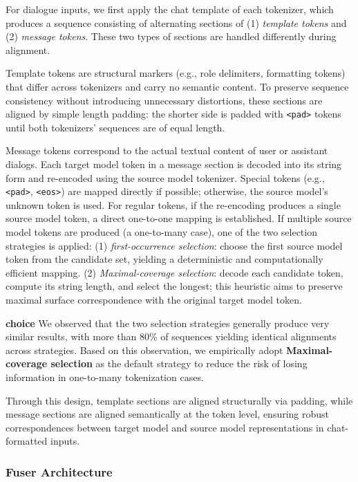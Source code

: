 For dialogue inputs, we first apply the chat template of each tokenizer, which produces a sequence consisting of alternating sections of (1) \emph{template tokens} and (2) \emph{message tokens}. These two types of sections are handled differently during alignment.

Template tokens are structural markers (e.g., role delimiters, formatting tokens) that differ across tokenizers and carry no semantic content. To preserve sequence consistency without introducing unnecessary distortions, these sections are aligned by simple length padding: the shorter side is padded with \texttt{<pad>} tokens until both tokenizers’ sequences are of equal length.

Message tokens correspond to the actual textual content of user or assistant dialogs. Each target model token in a message section is decoded into its string form and re-encoded using the source model tokenizer.
Special tokens (e.g., \texttt{<pad>}, \texttt{<eos>}) are mapped directly if possible; otherwise, the source model's unknown token is used.
For regular tokens, if the re-encoding produces a single source model token, a direct one-to-one mapping is established. If multiple source model tokens are produced (a one-to-many case), one of the two selection strategies is applied:
(1) \emph{first-occurrence selection}: choose the first source model token from the candidate set, yielding a deterministic and computationally efficient mapping.
(2) \emph{Maximal-coverage selection}: decode each candidate token, compute its string length, and select the longest; this heuristic aims to preserve maximal surface correspondence with the original target model token.

\textbf{\name choice} We observed that the two selection strategies generally produce very similar results, with more than 80\% of sequences yielding identical alignments across strategies. Based on this observation, we empirically adopt \textbf{Maximal-coverage selection} as the default strategy to reduce the risk of losing information in one-to-many tokenization cases.

Through this design, template sections are aligned structurally via padding, while message sections are aligned semantically at the token level, ensuring robust correspondences between target model and source model representations in chat-formatted inputs.

\subsubsection{Fuser Architecture}
\label{sec:appendix/arch}

